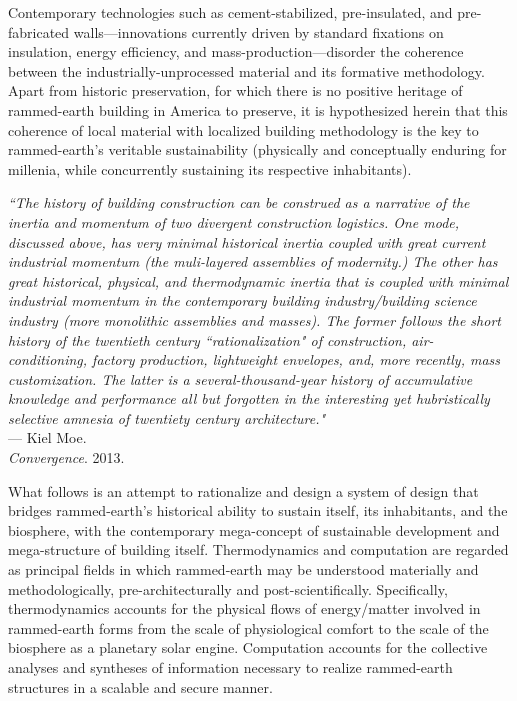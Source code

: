 Contemporary technologies such as cement-stabilized, pre-insulated, and pre-fabricated walls---innovations currently driven by standard fixations on insulation, energy efficiency, and mass-production---disorder the coherence between the industrially-unprocessed material and its formative methodology. Apart from historic preservation, for which there is no positive heritage of rammed-earth building in America to preserve, it is hypothesized herein that this coherence of local material with localized building methodology is the key to rammed-earth's veritable sustainability (physically and conceptually enduring for millenia, while concurrently sustaining its respective inhabitants).

\begin{flushright}
  \small{
  \textit{``The history of building construction can be construed as a narrative of the inertia and momentum of two divergent construction logistics. One mode, discussed above, has very minimal historical inertia coupled with great current industrial momentum (the muli-layered assemblies of modernity.) The other has great historical, physical, and thermodynamic inertia that is coupled with minimal industrial momentum in the contemporary building industry/building science industry (more monolithic assemblies and masses). The former follows the short history of the twentieth century ``rationalization" of construction, air-conditioning, factory production, lightweight envelopes, and, more recently, mass customization. The latter is a several-thousand-year history of accumulative knowledge and performance all but forgotten in the interesting yet hubristically selective amnesia of twentiety century architecture."}}\\ --- Kiel Moe. \\ \textit{Convergence}. 2013.
\end{flushright}

What follows is an attempt to rationalize and design a system of design that bridges rammed-earth's historical ability to sustain itself, its inhabitants, and the biosphere, with the contemporary mega-concept of sustainable development and mega-structure of building itself. Thermodynamics and computation are regarded as principal fields in which rammed-earth may be understood materially and methodologically, pre-architecturally and post-scientifically. Specifically, thermodynamics accounts for the physical flows of energy/matter involved in rammed-earth forms from the scale of physiological comfort to the scale of the biosphere as a planetary solar engine. Computation accounts for the collective analyses and syntheses of information necessary to realize rammed-earth structures in a scalable and secure manner.


